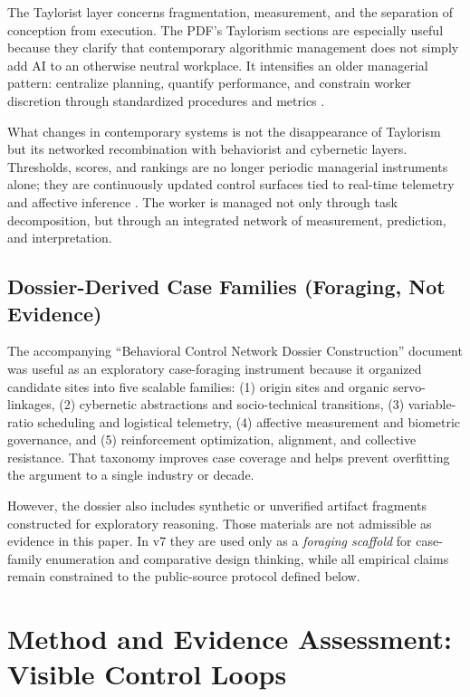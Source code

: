 \documentclass[runningheads]{llncs}
\begin{document}
The Taylorist layer concerns fragmentation, measurement, and the separation of conception from execution. The PDF's Taylorism sections are especially useful because they clarify that contemporary algorithmic management does not simply add AI to an otherwise neutral workplace. It intensifies an older managerial pattern: centralize planning, quantify performance, and constrain worker discretion through standardized procedures and metrics \cite{taylor1911principles}.

What changes in contemporary systems is not the disappearance of Taylorism but its networked recombination with behaviorist and cybernetic layers. Thresholds, scores, and rankings are no longer periodic managerial instruments alone; they are continuously updated control surfaces tied to real-time telemetry and affective inference \cite{kellogg2020algorithms}. The worker is managed not only through task decomposition, but through an integrated network of measurement, prediction, and interpretation.

\subsection{Dossier-Derived Case Families (Foraging, Not Evidence)}

The accompanying ``Behavioral Control Network Dossier Construction'' document was useful as an exploratory case-foraging instrument because it organized candidate sites into five scalable families: (1) origin sites and organic servo-linkages, (2) cybernetic abstractions and socio-technical transitions, (3) variable-ratio scheduling and logistical telemetry, (4) affective measurement and biometric governance, and (5) reinforcement optimization, alignment, and collective resistance. That taxonomy improves case coverage and helps prevent overfitting the argument to a single industry or decade.

However, the dossier also includes synthetic or unverified artifact fragments constructed for exploratory reasoning. Those materials are not admissible as evidence in this paper. In v7 they are used only as a \emph{foraging scaffold} for case-family enumeration and comparative design thinking, while all empirical claims remain constrained to the public-source protocol defined below.

\section{Method and Evidence Assessment: Visible Control Loops}
\end{document}
